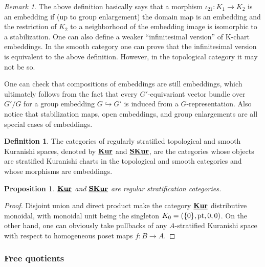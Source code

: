 \documentclass[reqno, 10pt]{amsart}
\numberwithin{equation}{section}
\numberwithin{equation}{section}
\newtheorem{prop}[thm]{Proposition}
\theoremstyle{definition}
\newtheorem{defn}[thm]{Definition}
\theoremstyle{remark}
\newtheorem{rem}[thm]{Remark}
\newcommand{\uds}[1]{\underline{\smash{#1}}}
\begin{document}
\begin{rem}
The above definition basically says that a morphism $\iota_{21}: K_1 \to K_2$ is an embedding if (up to group enlargement) the domain map is an embedding and the restriction of $K_2$ to a neighborhood of the embedding image is isomorphic to a stabilization. One can also define a weaker ``infinitesimal version'' of K-chart embeddings. In the smooth category one can prove that the infinitesimal version is equivalent to the above definition. However, in the topological category it may not be so.
\end{rem}

One can check that compositions of embeddings are still embeddings, which ultimately follows from the fact that every $G'$-equivariant vector bundle over $G' / G$ for a group embedding $G \hookrightarrow G'$ is induced from a $G$-representation. Also notice that stabilization maps, open embeddings, and group enlargements are all special cases of embeddings. 











\begin{defn}
The categories of regularly stratified topological and smooth Kuranishi spaces, denoted by $\uds{\bf Kur}$ and $\uds{\bf S Kur}$, are the categories whose objects are stratified Kuranishi charts in the topological and smooth categories and whose morphisms are embeddings. 
\end{defn}




\begin{prop}
$\uds{\bf Kur}$ and $\uds{\bf SKur}$ are regular stratification categories.
\end{prop}

\begin{proof}
Disjoint union and direct product make the category $\uds{\bf Kur}$ distributive monoidal, with monoidal unit being the singleton $K_0 = (\{0\}, {\rm pt}, 0, 0)$. On the other hand, one can obviously take pullbacks of any $A$-stratified Kuranishi space with respect to homogeneous poset maps $f: B \to A$. 
\end{proof}







\subsubsection{Free quotients}\label{subsec:free quotients}
\end{document}
